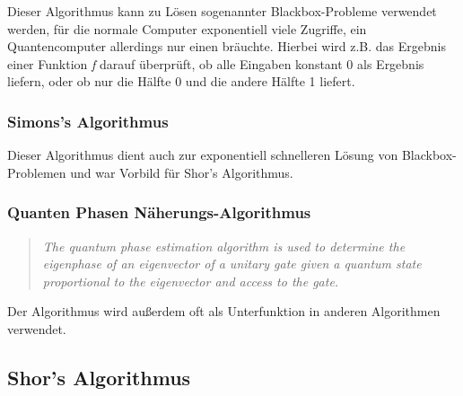 Dieser Algorithmus kann zu Lösen sogenannter Blackbox-Probleme verwendet werden, für die normale Computer exponentiell viele Zugriffe, ein Quantencomputer allerdings nur einen bräuchte.
Hierbei wird z.B. das Ergebnis einer Funktion \textit{f} darauf überprüft, ob alle Eingaben konstant 0 als Ergebnis liefern, oder ob nur die Hälfte 0 und die andere Hälfte 1 liefert. \cite{quantenalgorithmgwiki}


\subsubsection{Simons's Algorithmus}

Dieser Algorithmus dient auch zur exponentiell schnelleren Lösung von Blackbox-Problemen und war Vorbild für Shor's Algorithmus. \cite{quantenalgorithmgwiki}

\subsubsection{Quanten Phasen Näherungs-Algorithmus}

\begin{quote}
    \textit{The quantum phase estimation algorithm is used to determine the eigenphase of an eigenvector of a unitary gate given a quantum state proportional to the eigenvector and access to the gate.}\cite{quantenalgorithmgwiki}
\end{quote}
Der Algorithmus wird außerdem oft als Unterfunktion in anderen Algorithmen verwendet. 

\subsection{Shor's Algorithmus}
\label{sec:Shor's Algorithmus}



